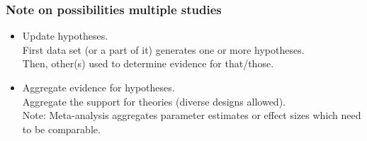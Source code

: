 \documentclass[10pt]{beamer}\usepackage[]{graphicx}\usepackage[]{xcolor}
\begin{document}
%
\begin{frame}
	\frametitle{Note on possibilities multiple studies}
	
	\begin{itemize}
		\item Update hypotheses. \\
		First data set (or a part of it) generates one or more hypotheses.\\
		Then, other(s) used to determine evidence for that/those.
		\item Aggregate evidence for hypotheses.\\
		Aggregate the support for theories (diverse designs allowed).\\
		Note: Meta-analysis aggregates parameter estimates or effect sizes which need to be comparable. 
	\end{itemize}
	
\end{frame}
%
\end{document}

